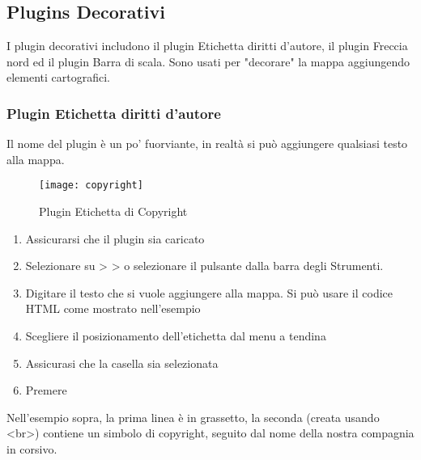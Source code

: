 
\subsection{Plugins Decorativi}


I plugin decorativi includono il plugin Etichetta diritti d'autore, il plugin Freccia nord ed il plugin Barra di scala. Sono usati per "decorare" la mappa aggiungendo elementi cartografici.

\subsubsection{Plugin Etichetta diritti d'autore}

Il nome del plugin è un po' fuorviante, in realtà si può aggiungere qualsiasi testo alla mappa.

\begin{figure}[ht]
   \begin{center}
   \caption{Plugin Etichetta di Copyright \nixcaption}\label{fig:copyright}\smallskip
   \texttt{[image: copyright]}
\end{center}  
\end{figure}

\begin{enumerate}
\item Assicurarsi che il plugin sia caricato
\item Selezionare su  >  >  o selezionare il pulsante  dalla barra degli Strumenti.
\item Digitare il testo che si vuole aggiungere alla mappa. Si può usare il codice HTML come mostrato nell'esempio
\item Scegliere il posizionamento dell'etichetta dal menu a tendina 
\item Assicurasi che la casella  sia selezionata
\item Premere  
\end{enumerate}

Nell'esempio sopra, la prima linea è in grassetto, la seconda (creata usando 
\textless br\textgreater) contiene un simbolo di copyright, seguito dal nome della nostra compagnia in corsivo.


